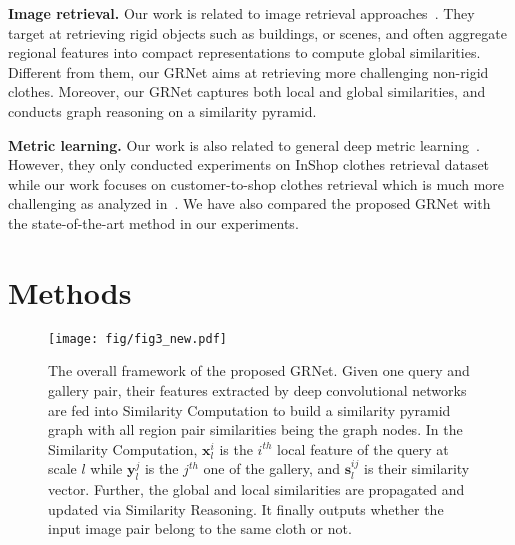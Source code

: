 \documentclass[10pt,twocolumn,letterpaper]{article}
\begin{document}
\textbf{Image retrieval.} Our work is related to image retrieval approaches~\cite{noh2016large,gordo2016end,Arandjelovic16,radenovic2016cnn,gordo2016deep,tolias2015particular,Yandex2016,chen2017acmmm,chen2019acmmm}.
They target at retrieving rigid objects such as buildings, or scenes,
and often aggregate regional features  into compact representations to compute global similarities.
Different from them, our GRNet aims at retrieving more challenging non-rigid clothes. Moreover, our GRNet captures both local and global similarities, and conducts graph reasoning on a similarity pyramid.

\textbf{Metric learning.} Our work is also related to general deep metric learning~\cite{Opitz2017a, Yuan2017,Kim2018,Opitz2017,Xuan2018}. However, they only conducted experiments on InShop clothes retrieval dataset while our work focuses on customer-to-shop clothes retrieval which is much more challenging as analyzed in~\cite{Liu2016}. We have also compared the proposed GRNet with the state-of-the-art method \cite{Xuan2018} in our experiments.

\section{Methods}

\begin{figure*}[t]
\centering
  \texttt{[image: fig/fig3\_new.pdf]}
\caption{The overall framework of the proposed GRNet. Given one query and gallery pair,
their features extracted by deep convolutional networks are fed into Similarity Computation to build a similarity pyramid graph with all region pair similarities being the graph nodes.
In the Similarity Computation, $\mathbf{x}_l^i$ is the $i^{th}$ local feature of the query at scale $l$ while  $\mathbf{y}_l^j$ is the $j^{th}$ one of the gallery, and $\mathbf{s}_l^{ij}$ is their similarity vector.
Further, the global and local similarities are propagated and updated via Similarity Reasoning.
It finally outputs whether the input image pair belong to the same cloth or not.}
\label{fig:framework}
\vspace{-2mm}
\end{figure*}
\end{document}
